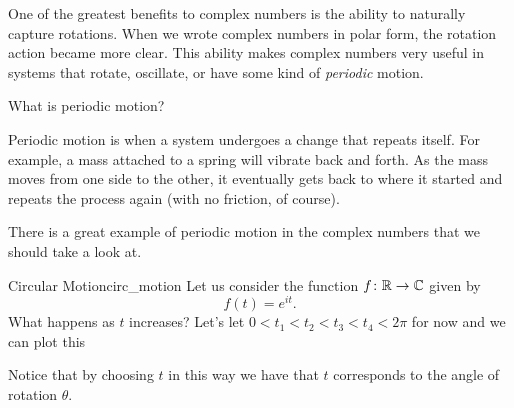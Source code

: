         One of the greatest benefits to complex numbers is the ability to naturally capture rotations.  When we wrote complex numbers in polar form, the rotation action became more clear. This ability makes complex numbers very useful in systems that rotate, oscillate, or have some kind of \emph{periodic} motion.

        \begin{question}
                What is periodic motion?
        \end{question}

        \begin{answer}
            Periodic motion is when a system undergoes a change that repeats itself.  For example, a mass attached to a spring will vibrate back and forth.  As the mass moves from one side to the other, it eventually gets back to where it started and repeats the process again (with no friction, of course).
        \end{answer}

        \noindent There is a great example of periodic motion in the complex numbers that we should take a look at.

        \begin{ex}{Circular Motion}{circ_motion}
            Let us consider the function $f\colon \mathbb{R} \to \mathbb{C}$ given by
            \[
            f(t)=e^{it}.
            \]
            What happens as $t$ increases? Let's let $0<t_1<t_2<t_3<t_4<2\pi$ for now and we can plot this
            \begin{center}
        \end{center}
        Notice that by choosing $t$ in this way we have that $t$ corresponds to the angle of rotation $\theta$.
        \end{ex}

